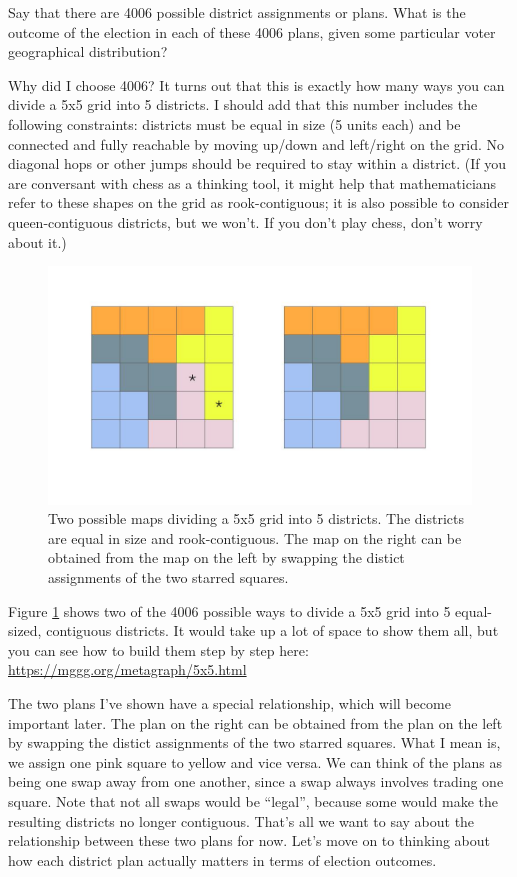 \documentclass[
  openany]{book}
\begin{document}
Say that there are 4006 possible district assignments or plans. What is the outcome of the election in each of these 4006 plans, given some particular voter geographical distribution?

Why did I choose 4006? It turns out that this is exactly how many ways you can divide a 5x5 grid into 5 districts. I should add that this number includes the following constraints: districts must be equal in size (5 units each) and be connected and fully reachable by moving up/down and left/right on the grid. No diagonal hops or other jumps should be required to stay within a district. (If you are conversant with chess as a thinking tool, it might help that mathematicians refer to these shapes on the grid as rook-contiguous; it is also possible to consider queen-contiguous districts, but we won't. If you don't play chess, don't worry about it.)

\begin{figure}

{\centering \includegraphics[width=0.9\linewidth]{images/gerrymandering5x5_1}

}

\caption{Two possible maps dividing a 5x5 grid into 5 districts. The districts are equal in size and rook-contiguous. The map on the right can be obtained from the map on the left by swapping the distict assignments of the two starred squares.}\label{fig:gerrymandering-5x5-1}
\end{figure}

Figure \ref{fig:gerrymandering-5x5-1} shows two of the 4006 possible ways to divide a 5x5 grid into 5 equal-sized, contiguous districts. It would take up a lot of space to show them all, but you can see how to build them step by step here: \url{https://mggg.org/metagraph/5x5.html}

The two plans I've shown have a special relationship, which will become important later. The plan on the right can be obtained from the plan on the left by swapping the distict assignments of the two starred squares. What I mean is, we assign one pink square to yellow and vice versa. We can think of the plans as being one swap away from one another, since a swap always involves trading one square. Note that not all swaps would be ``legal'', because some would make the resulting districts no longer contiguous. That's all we want to say about the relationship between these two plans for now. Let's move on to thinking about how each district plan actually matters in terms of election outcomes.
\end{document}
